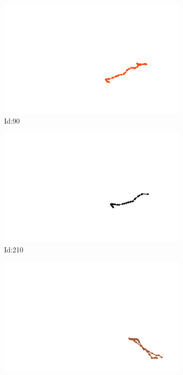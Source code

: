 \documentclass[12pt,twoside]{report}
\begin{document}
\begin{figure}
\centering
\begin{subfigure}[b]{0.20\textwidth}
\centering
\includegraphics[width=\textwidth]{../../trajectories/90.png}
\caption{Id:90}
\end{subfigure}
\begin{subfigure}[b]{0.20\textwidth}
\centering
\includegraphics[width=\textwidth]{../../trajectories/210.png}
\caption{Id:210}
\end{subfigure}
\begin{subfigure}[b]{0.20\textwidth}
\centering
\includegraphics[width=\textwidth]{../../trajectories/240.png}

\end{subfigure}
\end{figure}
\end{document}
